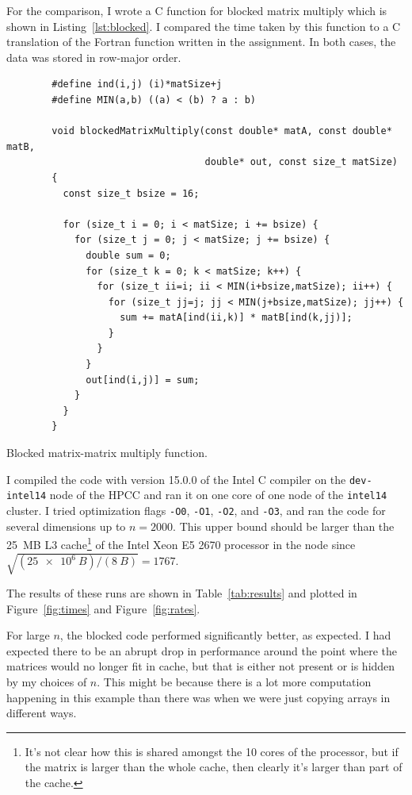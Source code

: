 \documentclass{article}
\begin{document}
    For the comparison, I wrote a C function for blocked matrix multiply which is shown in Listing~\ref{lst:blocked}. I compared the time taken by this function to a C translation of the Fortran function written in the assignment. In both cases, the data was stored in row-major order.

    \begin{listing}
    \begin{verbatim}
        #define ind(i,j) (i)*matSize+j
        #define MIN(a,b) ((a) < (b) ? a : b)

        void blockedMatrixMultiply(const double* matA, const double* matB,
                                   double* out, const size_t matSize)
        {
          const size_t bsize = 16;

          for (size_t i = 0; i < matSize; i += bsize) {
            for (size_t j = 0; j < matSize; j += bsize) {
              double sum = 0;
              for (size_t k = 0; k < matSize; k++) {
                for (size_t ii=i; ii < MIN(i+bsize,matSize); ii++) {
                  for (size_t jj=j; jj < MIN(j+bsize,matSize); jj++) {
                    sum += matA[ind(ii,k)] * matB[ind(k,jj)];
                  }
                }
              }
              out[ind(i,j)] = sum;
            }
          }
        }
    \end{verbatim}
    \caption{Blocked matrix-matrix multiply function.}
    \label{lst:blocked}
    \end{listing}

    I compiled the code with version 15.0.0 of the Intel C compiler on the \texttt{dev-intel14} node of the HPCC and ran it on one core of one node of the \texttt{intel14} cluster. I tried optimization flags \texttt{-O0}, \texttt{-O1}, \texttt{-O2}, and \texttt{-O3}, and ran the code for several dimensions up to $n=2000$. This upper bound should be larger than the \SI{25}{MB} L3 cache\footnote{It's not clear how this is shared amongst the 10 cores of the processor, but if the matrix is larger than the whole cache, then clearly it's larger than part of the cache.} of the Intel Xeon E5 2670 processor in the node since $\sqrt{(\SI{25e6}{B}) / (\SI{8}{B})} = 1767$.

    The results of these runs are shown in Table~\ref{tab:results} and plotted in Figure~\ref{fig:times} and Figure~\ref{fig:rates}.

    For large $n$, the blocked code performed significantly better, as expected. I had expected there to be an abrupt drop in performance around the point where the matrices would no longer fit in cache, but that is either not present or is hidden by my choices of $n$. This might be because there is a lot more computation happening in this example than there was when we were just copying arrays in different ways.
\end{document}
